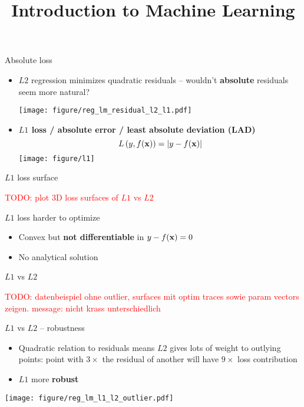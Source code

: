 \documentclass[11pt,compress,t,notes=noshow, xcolor=table]{beamer}
\title{Introduction to Machine Learning}
\institute{\href{https://compstat-lmu.github.io/lecture_i2ml/}{compstat-lmu.github.io/lecture\_i2ml}}
\date{}
\begin{document}


\begin{vbframe}{Absolute loss}

\begin{itemize}
    \item $L2$ regression minimizes quadratic residuals -- wouldn't 
    \textbf{absolute} residuals seem more natural? 
    
    \vspace{0.2cm}
    \texttt{[image: figure/reg\_lm\_residual\_l2\_l1.pdf]}
    \item \textbf{$L1$ loss / absolute error / least absolute deviation (LAD)}
    $$L\left(y, f(\mathbf{x})\right) = |y - f(\mathbf{x})|$$
    \texttt{[image: figure/l1]} 
\end{itemize}

\end{vbframe}


\begin{vbframe}{$L1$ loss surface}

\textcolor{red}{TODO: plot 3D loss surfaces of $L1$ vs $L2$}
\vfill

$L1$ loss harder to optimize
\begin{itemize}
    \item Convex but \textbf{not differentiable} in 
    $y - f(\mathbf{x}) = 0$
    \item No analytical solution
\end{itemize}

\end{vbframe}


\begin{vbframe}{$L1$ vs $L2$}

\textcolor{red}{TODO: datenbeispiel ohne outlier, surfaces mit optim traces 
sowie param vectors zeigen. message: nicht krass unterschiedlich}

\end{vbframe}


\begin{vbframe}{$L1$ vs $L2$ -- robustness}

\begin{itemize}
    \item Quadratic relation to residuals means $L2$ gives lots of weight to 
    outlying points: point with $3 \times$ the residual of another will have 
    $9 \times$ loss contribution
    \item $L1$ more \textbf{robust}
\end{itemize}

\vfill
\texttt{[image: figure/reg\_lm\_l1\_l2\_outlier.pdf]}

\end{vbframe}
\end{document}
